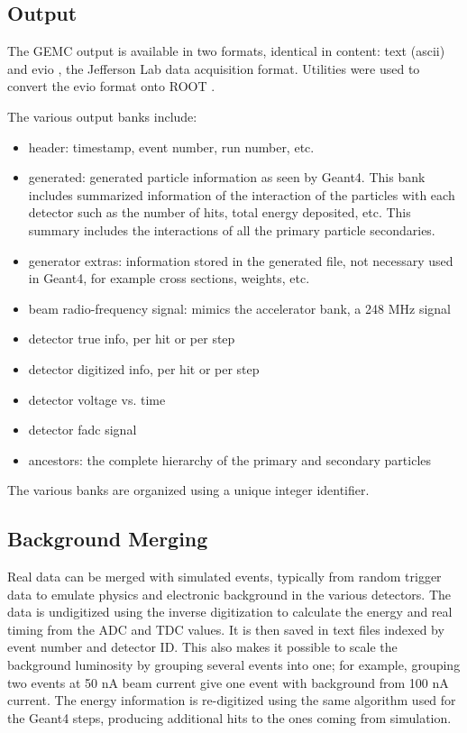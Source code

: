 \subsection{Output}

The GEMC output is available in two formats, identical in content: text (ascii) and evio \cite{evio}, the Jefferson Lab
data acquisition format.
Utilities were used to convert the evio format onto ROOT \cite{root}.

The various output banks include:

\begin{itemize}
	\item header: timestamp, event number, run number, etc.
	\item generated: generated particle information as seen by Geant4. This bank includes summarized information of the interaction of
                     the particles with each detector such as the number of hits, total energy deposited, etc. This summary includes
                     the interactions of all the primary particle secondaries.
	\item generator extras: information stored in the generated file, not necessary used in Geant4, for example cross sections, weights, etc.
	\item beam radio-frequency signal: mimics the accelerator bank, a 248 MHz signal
	\item detector true info, per hit or per step
	\item detector digitized info, per hit or per step
	\item detector voltage vs. time
	\item detector fadc signal
	\item ancestors: the complete hierarchy of the primary and secondary particles
\end{itemize}

The various banks are organized using a unique integer identifier.

\subsection{Background Merging}

Real data can be merged with simulated events, typically from random trigger data to emulate physics and electronic background in
the various detectors.
The data is un\-digitized using the inverse digitization to calculate the energy and real timing from the ADC and TDC values.
It is then saved in text files indexed by event number and detector ID. This also makes it possible to scale the background luminosity by grouping
several events into one; for example, grouping two events at 50 nA beam current give one event with background from 100 nA current.
The energy information is re-digitized using the same algorithm used for the Geant4 steps, producing additional hits to the ones coming from simulation.


